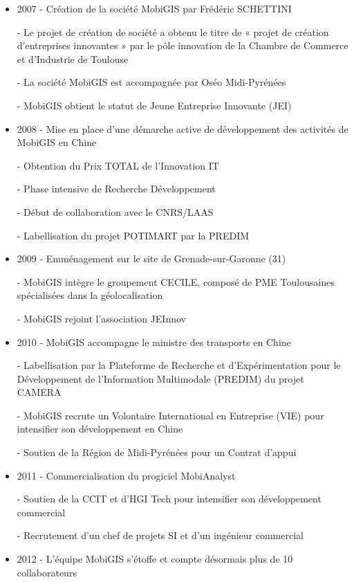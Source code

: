 \renewcommand{\labelitemi}{\textbullet}
\begin{itemize}
\item 2007 
    - Création de la société MobiGIS par Frédéric SCHETTINI 
		
    - Le projet de création de société a obtenu le titre de « projet de création d'entreprises innovantes » par le pôle innovation de la Chambre de Commerce et d'Industrie de Toulouse 
		
    - La société MobiGIS est accompagnée par Oséo Midi-Pyrénées 
    
		- MobiGIS obtient le statut de Jeune Entreprise Innovante (JEI) 
\\
\item 2008 
    - Mise en place d'une démarche active de développement des activités de MobiGIS en Chine 
    
		- Obtention du Prix TOTAL de l'Innovation IT 
    
		- Phase intensive de Recherche Développement 
    
		- Début de collaboration avec le CNRS/LAAS 
    
		- Labellisation du projet POTIMART par la PREDIM 
\\
\item 2009 
    - Emménagement sur le site de Grenade-sur-Garonne (31) 
    
		- MobiGIS intègre le groupement CECILE, composé de PME Toulousaines spécialisées dans la géolocalisation 
    
		- MobiGIS rejoint l'association JEInnov 
\\
\item 2010 
    - MobiGIS accompagne le ministre des transports en Chine 
    
		- Labellisation par la Plateforme de Recherche et d'Expérimentation pour le Développement de l'Information Multimodale (PREDIM) du projet CAMERA 
    
		- MobiGIS recrute un Volontaire International en Entreprise (VIE) pour intensifier son développement en Chine 
    
		- Soutien de la Région de Midi-Pyrénées pour un Contrat d'appui 
\\
\item 2011 
    - Commercialisation du progiciel MobiAnalyst 
    
		- Soutien de la CCIT et d'HGI Tech pour intensifier son développement commercial 
    
		- Recrutement d'un chef de projets SI et d'un ingénieur commercial 
\\
\item 2012 
    - L'équipe MobiGIS s'étoffe et compte désormais plus de 10 collaborateurs 
    

\end{itemize}
